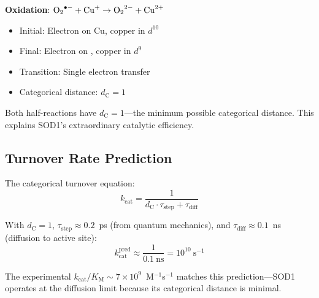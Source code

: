 \documentclass[twocolumn,aps,prx,superscriptaddress,longbibliography]{revtex4-2}
\theoremstyle{remark}
\newcommand{\kcat}{k_\text{cat}}
\newcommand{\Km}{K_\text{M}}
\newcommand{\dC}{d_\text{C}}
\begin{document}
\textbf{Oxidation}: $\ce{O2^{.-}} + \ce{Cu^{+}} \to \ce{O2^{2-}} + \ce{Cu^{2+}}$
\begin{itemize}
    \item Initial: Electron on Cu, copper in $d^{10}$
    \item Final: Electron on , copper in $d^9$
    \item Transition: Single electron transfer
    \item Categorical distance: $\dC = 1$
\end{itemize}

Both half-reactions have $\dC = 1$---the minimum possible categorical
distance. This explains SOD1's extraordinary catalytic efficiency.

\subsection{Turnover Rate Prediction}

The categorical turnover equation:
\begin{equation}
\kcat = \frac{1}{\dC \cdot \tau_\text{step} + \tau_\text{diff}}
\label{eq:turnover}
\end{equation}

With $\dC = 1$, $\tau_\text{step} \approx 0.2$~ps (from quantum mechanics),
and $\tau_\text{diff} \approx 0.1$~ns (diffusion to active site):
\begin{equation}
\kcat^\text{pred} \approx \frac{1}{0.1~\text{ns}} = 10^{10}~\text{s}^{-1}
\end{equation}

The experimental $\kcat/\Km \sim 7 \times 10^9$~M$^{-1}$s$^{-1}$ matches
this prediction---SOD1 operates at the diffusion limit because its
categorical distance is minimal.
\end{document}
